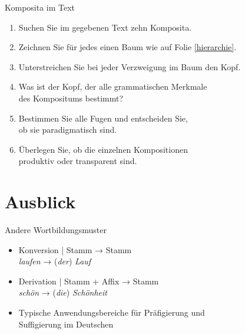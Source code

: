 \begin{frame}
  {Komposita im Text}
  \begin{enumerate}
    \item Suchen Sie im gegebenen Text \alert{zehn Komposita}.
    \item Zeichnen Sie für jedes einen \alert{Baum} wie auf Folie \ref{hierarchie}.
    \item Unterstreichen Sie bei jeder Verzweigung im Baum den \alert{Kopf}.
    \item Was ist der Kopf, der alle grammatischen Merkmale\\
      des Kompositums bestimmt?
    \item Bestimmen Sie alle \alert{Fugen} und entscheiden Sie,\\
      ob sie \alert{paradigmatisch} sind.
    \item Überlegen Sie, ob die einzelnen Kompositionen\\
      \alert{produktiv} oder \alert{transparent} sind.\\
  \end{enumerate}
\end{frame}

\section{Ausblick}

\begin{frame}
  {Andere Wortbildungsmuster}
  \onslide<+->
  \begin{itemize}[<+->]
    \item \alert{Konversion} | Stamm → Stamm \\ 
      \textit{laufen} → (\textit{der}) \textit{Lauf}
      \Zeile
    \item \alert{Derivation} | Stamm + Affix → Stamm\\
      \textit{schön} → (\textit{die}) \textit{Schönheit}
      \Halbzeile
    \item Typische Anwendungsbereiche für \alert{Präfigierung} und\\
      \alert{Suffigierung} im Deutschen
  \end{itemize}
\end{frame}
